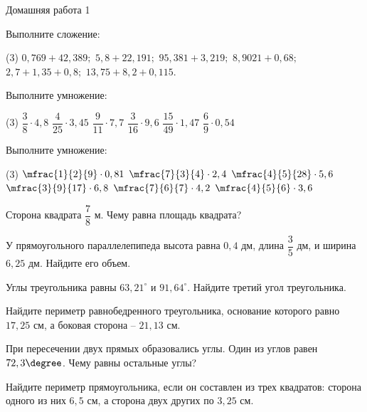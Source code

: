 \begin{homework}[number=1]
	\begin{listofex}
		\item Домашняя работа 1
	\end{listofex}
\end{homework}

\begin{class}[number=3]
	\begin{listofex}
		\item Выполните сложение: \begin{tasks}(3)
			\task \( 0,769 + 42,389; \)
			\task \( 5,8 + 22,191;  \)
			\task \( 95,381 + 3,219; \)
			\task \( 8,9021 + 0,68;  \)
			\task\(  2,7 + 1,35 + 0,8;  \)
			\task\( 13,75 + 8,2 + 0,115. \)
		\end{tasks}
		\item Выполните умножение:\begin{tasks}(3)
			\task \( \dfrac{3}{8}\cdot4,8 \)
			\task\( \dfrac{4}{25}\cdot3,45 \)
			\task\( \dfrac{9}{11}\cdot7,7 \)
			\task\( \dfrac{3}{16}\cdot9,6 \)
			\task\( \dfrac{15}{49}\cdot1,47 \)
			\task\( \dfrac{6}{9}\cdot0,54 \)
		\end{tasks}
		\item Выполните умножение:
		\begin{tasks}(3)
			\task \( \mfrac{1}{2}{9}\cdot0,81 \)
			\task \( \mfrac{7}{3}{4}\cdot2,4 \)
			\task \( \mfrac{4}{5}{28}\cdot 5,6 \)
			\task \( \mfrac{3}{9}{17} \cdot 6,8 \)
			\task \( \mfrac{7}{6}{7}\cdot 4,2 \)
			\task \( \mfrac{4}{5}{6}\cdot3,6 \)
		\end{tasks}
		\item Сторона квадрата \( \dfrac{7}{8} \) м. Чему равна площадь квадрата?
		\item У прямоугольного параллелепипеда высота равна \( 0,4 \) дм, длина \( \dfrac{3}{5} \) дм, и ширина \( 6,25 \) дм. Найдите его объем.
		\item Углы треугольника равны \( 63,21^{\circ} \) и \( 91,64^{\circ} \). Найдите третий угол треугольника.
		\item Найдите периметр равнобедренного треугольника, основание которого равно \( 17,25 \) см, а боковая сторона – \( 21,13 \) см.
		\item При пересечении двух прямых образовались углы. Один из углов равен \( 72,3\degree \). Чему равны остальные углы?
		\item Найдите периметр прямоугольника, если он составлен из трех квадратов: сторона одного из них \( 6,5 \) см, а сторона двух других по \( 3,25 \) см. 

\end{listofex}
\end{class}
